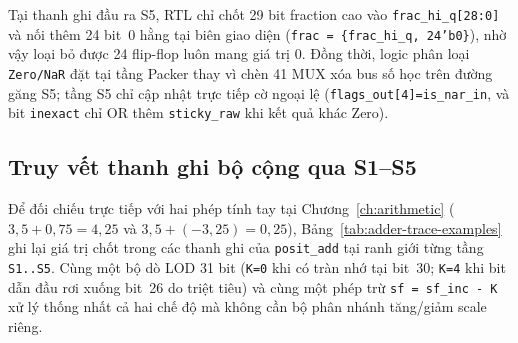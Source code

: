 Tại thanh ghi đầu ra S5, RTL chỉ chốt 29 bit fraction cao vào \texttt{frac\_hi\_q[28:0]}
và nối thêm 24 bit~0 hằng tại biên giao diện (\texttt{frac = \{frac\_hi\_q, 24'b0\}}),
nhờ vậy loại bỏ được 24 flip-flop luôn mang giá trị 0. Đồng thời, logic phân loại
\texttt{Zero/NaR} đặt tại tầng Packer thay vì chèn 41 MUX xóa bus số học trên đường
găng S5; tầng S5 chỉ cập nhật trực tiếp cờ ngoại lệ (\texttt{flags\_out[4]=is\_nar\_in},
và bit \texttt{inexact} chỉ OR thêm \texttt{sticky\_raw} khi kết quả khác Zero).



\subsection{Truy vết thanh ghi bộ cộng qua S1--S5}

Để đối chiếu trực tiếp với hai phép tính tay tại Chương~\ref{ch:arithmetic}
($3{,}5 + 0{,}75 = 4{,}25$ và $3{,}5 + (-3{,}25) = 0{,}25$),
Bảng~\ref{tab:adder-trace-examples} ghi lại giá trị chốt trong các thanh ghi
của \texttt{posit\_add} tại ranh giới từng tầng \texttt{S1..S5}. Cùng một bộ
dò LOD 31 bit (\texttt{K=0} khi có tràn nhớ tại bit~30; \texttt{K=4} khi
bit dẫn đầu rơi xuống bit~26 do triệt tiêu) và cùng một phép trừ
\texttt{sf = sf\_inc - K} xử lý thống nhất cả hai chế độ mà không cần bộ
phân nhánh tăng/giảm scale riêng.

